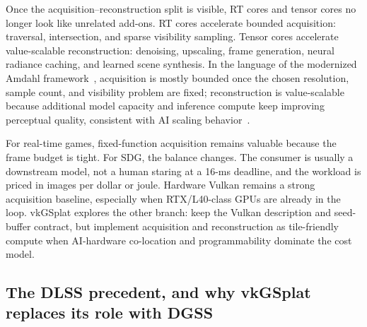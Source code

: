 \documentclass[10pt,journal,onecolumn]{IEEEtran}
\begin{document}
Once the acquisition--reconstruction split is visible, RT cores and
tensor cores no longer look like unrelated add-ons. RT cores accelerate
bounded acquisition: traversal, intersection, and sparse visibility
sampling. Tensor cores accelerate value-scalable reconstruction:
denoising, upscaling, frame generation, neural radiance caching, and
learned scene synthesis. In the language of the modernized Amdahl
framework~\cite{lu2026amdahl}, acquisition is mostly bounded once the
chosen resolution, sample count, and visibility problem are fixed;
reconstruction is value-scalable because additional model capacity and
inference compute keep improving perceptual quality, consistent with AI
scaling behavior~\cite{kaplan2020,lu2026}.

For real-time games, fixed-function acquisition remains valuable because
the frame budget is tight. For SDG, the balance changes. The consumer is
usually a downstream model, not a human staring at a 16-ms deadline, and
the workload is priced in images per dollar or joule. Hardware Vulkan remains a
strong acquisition baseline, especially when RTX/L40-class GPUs are already in
the loop. vkGSplat explores the other branch: keep the Vulkan description and
seed-buffer contract, but implement acquisition and reconstruction as
tile-friendly compute when AI-hardware co-location and programmability dominate
the cost model.

\subsection{The DLSS precedent, and why vkGSplat replaces its role with DGSS}
\label{sec:dlss}
\end{document}
